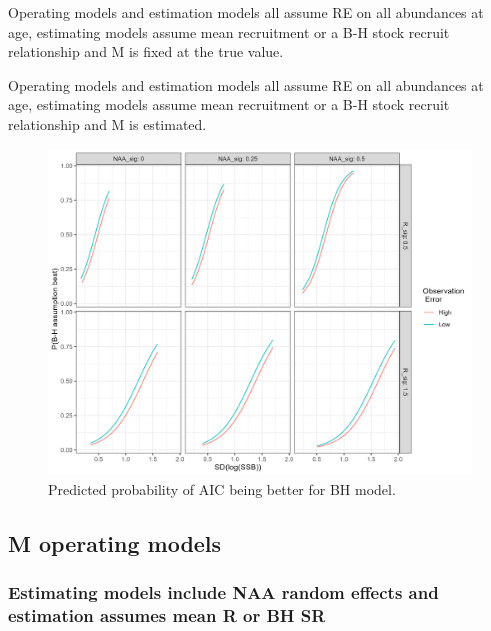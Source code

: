 \documentclass[
  12pt,
]{article}
\begin{document}
\begin{table}
\caption{Operating models and estimation models all assume RE on all abundances at age, estimating models assume mean recruitment or a B-H stock recruit relationship and M is fixed at the true value.}
{}
\end{table}

\begin{table}
\caption{Operating models and estimation models all assume RE on all abundances at age, estimating models assume mean recruitment or a B-H stock recruit relationship and M is estimated.}
{}
\end{table}
\clearpage

\begin{figure}
\caption{Predicted probability of AIC being better for BH model.}\label{glm_res_NAA_re}
\begin{center}
\includegraphics[width = \textwidth]{pred_SR_best_NAA_oms.png}
\end{center}
\end{figure}

\hypertarget{m-operating-models}{%
\subsection{M operating models}\label{m-operating-models}}

\hypertarget{estimating-models-include-naa-random-effects-and-estimation-assumes-mean-r-or-bh-sr-1}{%
\subsubsection{Estimating models include NAA random effects and
estimation assumes mean R or BH
SR}\label{estimating-models-include-naa-random-effects-and-estimation-assumes-mean-r-or-bh-sr-1}}
\end{document}
